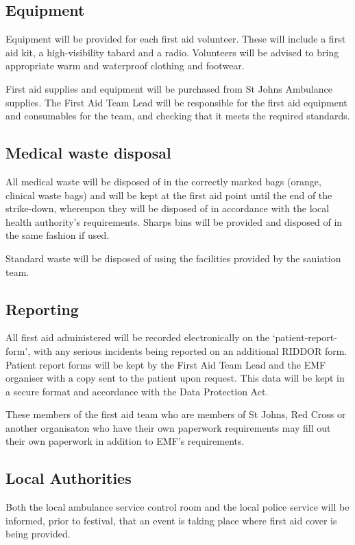 \subsection{Equipment}
Equipment will be provided for each first aid volunteer. These will include a
first aid kit, a high-visibility tabard and a radio. Volunteers will be advised
to bring appropriate warm and waterproof clothing and footwear.

First aid supplies and equipment will be purchased from St Johns Ambulance
supplies. The First Aid Team Lead will be responsible for the first aid
equipment and consumables for the team, and checking that it meets the required
standards.

\subsection{Medical waste disposal}
All medical waste will be disposed of in the correctly marked bags (orange,
clinical waste bags) and will be kept at the first aid point until the end of
the strike-down, whereupon they will be disposed of in accordance with the
local health authority's requirements. Sharps bins will be provided and
disposed of in the same fashion if used.

Standard waste will be disposed of using the facilities provided by the saniation team.

\subsection{Reporting}
All first aid administered will be recorded electronically on the
‘patient-report-form', with any serious incidents being reported on an
additional RIDDOR form. Patient report forms will be kept by the First Aid Team
Lead and the EMF organiser with a copy sent to the patient upon request. This
data will be kept in a secure format and accordance with the Data Protection
Act.

These members of the first aid team who are members of St Johns, Red Cross or another
organisaton who have their own paperwork requirements may fill out their own paperwork
in addition to EMF's requirements.

\subsection{Local Authorities}
Both the local ambulance service control room and the local police service will
be informed, prior to festival, that an event is taking place where first aid
cover is being provided.

